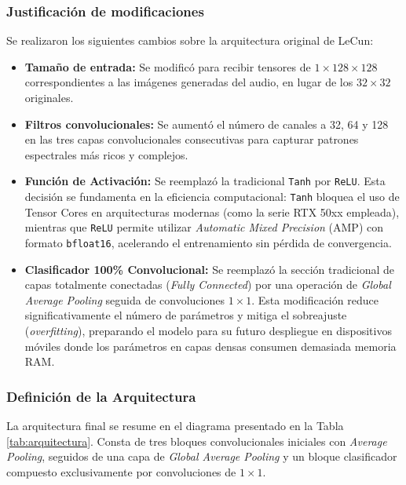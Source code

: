 \documentclass[conference]{IEEEtran}
\begin{document}
\subsubsection{Justificación de modificaciones}
Se realizaron los siguientes cambios sobre la arquitectura original de LeCun:
\begin{itemize}
    \item \textbf{Tamaño de entrada:} Se modificó para recibir tensores de $1 \times 128 \times 128$ correspondientes a las imágenes generadas del audio, en lugar de los $32 \times 32$ originales.
    \item \textbf{Filtros convolucionales:} Se aumentó el número de canales a 32, 64 y 128 en las tres capas convolucionales consecutivas para capturar patrones espectrales más ricos y complejos.
    \item \textbf{Función de Activación:} Se reemplazó la tradicional \texttt{Tanh} por \texttt{ReLU}. Esta decisión se fundamenta en la eficiencia computacional: \texttt{Tanh} bloquea el uso de Tensor Cores en arquitecturas modernas (como la serie RTX 50xx empleada), mientras que \texttt{ReLU} permite utilizar \textit{Automatic Mixed Precision} (AMP) con formato \texttt{bfloat16}, acelerando el entrenamiento sin pérdida de convergencia.
    \item \textbf{Clasificador 100\% Convolucional:} Se reemplazó la sección tradicional de capas totalmente conectadas (\textit{Fully Connected}) por una operación de \textit{Global Average Pooling} seguida de convoluciones $1 \times 1$. Esta modificación reduce significativamente el número de parámetros y mitiga el sobreajuste (\textit{overfitting}), preparando el modelo para su futuro despliegue en dispositivos móviles donde los parámetros en capas densas consumen demasiada memoria RAM.
\end{itemize}

\subsubsection{Definición de la Arquitectura}
La arquitectura final se resume en el diagrama presentado en la Tabla \ref{tab:arquitectura}. Consta de tres bloques convolucionales iniciales con \textit{Average Pooling}, seguidos de una capa de \textit{Global Average Pooling} y un bloque clasificador compuesto exclusivamente por convoluciones de $1 \times 1$.
\end{document}
